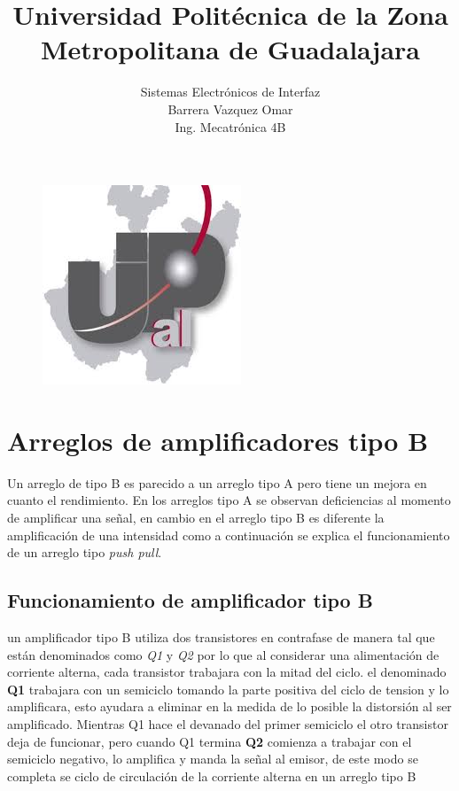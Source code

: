 \documentclass[11pt,a4paper]{article}
\title{Universidad Politécnica de la Zona Metropolitana de Guadalajara}
\begin{document}
\maketitle


\begin{figure}[hbtp]
\begin{center}
\includegraphics[scale=1]{1.jpeg}
\end{center}
\end{figure}


\begin{center}
\author{Sistemas Electrónicos de Interfaz\\
Barrera Vazquez Omar\\
Ing. Mecatrónica 4B}
\end{center}

\newpage

\section{Arreglos de amplificadores tipo B}

Un arreglo de tipo B es parecido a un arreglo tipo A pero tiene un mejora en cuanto el rendimiento. En los arreglos tipo A se observan deficiencias al momento de amplificar una señal, en cambio en el arreglo tipo B es diferente la amplificación de una intensidad como a continuación se explica el funcionamiento de un arreglo tipo \emph{push pull}. 

\subsection{Funcionamiento de amplificador tipo B}

un amplificador tipo B utiliza dos transistores en contrafase de manera tal que están denominados como \emph{Q1} y \emph{Q2} por lo que al considerar una alimentación de corriente alterna, cada transistor trabajara con la mitad del ciclo. el denominado \textbf{Q1} trabajara con un semiciclo tomando la parte positiva del ciclo de tension y lo amplificara, esto ayudara a eliminar en la medida de lo posible la distorsión al ser amplificado. Mientras Q1 hace el devanado del primer semiciclo el otro transistor deja de funcionar, pero cuando Q1 termina \textbf{Q2} comienza a trabajar con el semiciclo negativo, lo amplifica y manda la señal al emisor, de este modo se completa se ciclo de circulación de la corriente alterna en un arreglo tipo B 
\end{document}
